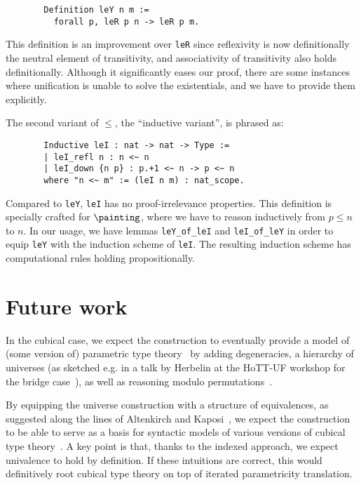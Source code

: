 \documentclass[10pt]{art.cls/art}
\begin{document}
\begin{figure}[H]
  \begin{verbatim}
  Definition leY n m :=
    forall p, leR p n -> leR p m.
  \end{verbatim}
\end{figure}

This definition is an improvement over \texttt{leR} since reflexivity is now definitionally the neutral element of transitivity, and associativity of transitivity also holds definitionally. Although it significantly eases our proof, there are some instances where unification is unable to solve the existentials, and we have to provide them explicitly.

The second variant of $\leq$, the ``inductive variant'', is phrased as:

\begin{figure}[H]
  \begin{verbatim}
  Inductive leI : nat -> nat -> Type :=
  | leI_refl n : n <~ n
  | leI_down {n p} : p.+1 <~ n -> p <~ n
  where "n <~ m" := (leI n m) : nat_scope.
  \end{verbatim}
\end{figure}

Compared to \texttt{leY}, \texttt{leI} has no proof-irrelevance properties. This definition is specially crafted for $\painting$, where we have to reason inductively from $p \leq n$ to $n$. In our usage, we have lemmas \texttt{leY\_of\_leI} and \texttt{leI\_of\_leY} in order to equip \texttt{leY} with the induction scheme of \texttt{leI}. The resulting induction scheme has computational rules holding propositionally.

\section{Future work}
In the cubical case, we expect the construction to eventually provide a model of (some version of) parametric type theory~\cite{nuyts17,cavallo19} by adding degeneracies, a hierarchy of universes (as sketched e.g. in a talk by Herbelin at the HoTT-UF workshop for the bridge case~\cite{herbelin-hott-uf}), as well as reasoning modulo permutations~\cite{grandis03}.

By equipping the universe construction with a structure of equivalences, as suggested along the lines of Altenkirch and Kaposi~\cite{altenkirch15}, we expect the construction to be able to serve as a basis for syntactic models of various versions of cubical type theory~\cite{bezem13,cohen16,angiuli21}. A key point is that, thanks to the indexed approach, we expect univalence to hold by definition. If these intuitions are correct, this would definitively root cubical type theory on top of iterated parametricity translation.



\end{document}
